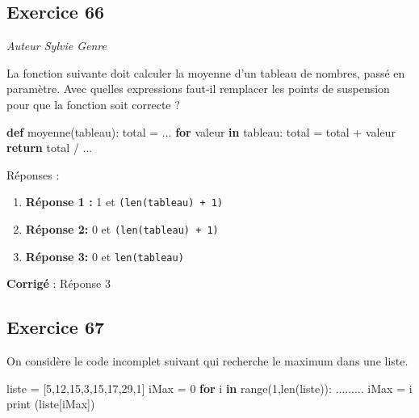\documentclass[11pt]{article}
\providecommand{\tightlist}{%
      \setlength{\itemsep}{0pt}\setlength{\parskip}{0pt}}
\newenvironment{Shaded}{}{}
\newcommand{\KeywordTok}[1]{\textcolor[rgb]{0.00,0.44,0.13}{\textbf{{#1}}}}
\newcommand{\DecValTok}[1]{\textcolor[rgb]{0.25,0.63,0.44}{{#1}}}
\newcommand{\NormalTok}[1]{{#1}}
\newcommand{\ControlFlowTok}[1]{\textcolor[rgb]{0.00,0.44,0.13}{\textbf{{#1}}}}
\newcommand{\OperatorTok}[1]{\textcolor[rgb]{0.40,0.40,0.40}{{#1}}}
\newcommand{\BuiltInTok}[1]{{#1}}
\begin{document}
    \hypertarget{exercice-66}{%
\subsection{Exercice 66}\label{exercice-66}}

\emph{Auteur Sylvie Genre}

La fonction suivante doit calculer la moyenne d'un tableau de nombres,
passé en paramètre. Avec quelles expressions faut-il remplacer les
points de suspension pour que la fonction soit correcte ?

\begin{Shaded}
\begin{Highlighting}[]
\KeywordTok{def}\NormalTok{ moyenne(tableau):}
\NormalTok{    total }\OperatorTok{=}\NormalTok{ ...}
    \ControlFlowTok{for}\NormalTok{ valeur }\KeywordTok{in}\NormalTok{ tableau:}
\NormalTok{        total }\OperatorTok{=}\NormalTok{ total }\OperatorTok{+}\NormalTok{ valeur}
    \ControlFlowTok{return}\NormalTok{ total }\OperatorTok{/}\NormalTok{ ...}
\end{Highlighting}
\end{Shaded}

Réponses :

\begin{enumerate}
\def\labelenumi{\arabic{enumi}.}
\tightlist
\item
  \textbf{Réponse 1 :} 1 et \texttt{(len(tableau)\ +\ 1)}
\item
  \textbf{Réponse 2:} 0 et \texttt{(len(tableau)\ +\ 1)}
\item
  \textbf{Réponse 3:} 0 et \texttt{len(tableau)}
\end{enumerate}

    \textbf{Corrigé} : Réponse 3

    \hypertarget{exercice-67}{%
\subsection{Exercice 67}\label{exercice-67}}

On considère le code incomplet suivant qui recherche le maximum dans une
liste.

\begin{Shaded}
\begin{Highlighting}[]
\NormalTok{liste }\OperatorTok{=}\NormalTok{ [}\DecValTok{5}\NormalTok{,}\DecValTok{12}\NormalTok{,}\DecValTok{15}\NormalTok{,}\DecValTok{3}\NormalTok{,}\DecValTok{15}\NormalTok{,}\DecValTok{17}\NormalTok{,}\DecValTok{29}\NormalTok{,}\DecValTok{1}\NormalTok{]}
\NormalTok{iMax }\OperatorTok{=} \DecValTok{0}
\ControlFlowTok{for}\NormalTok{ i }\KeywordTok{in} \BuiltInTok{range}\NormalTok{(}\DecValTok{1}\NormalTok{,}\BuiltInTok{len}\NormalTok{(liste)):}
\NormalTok{    .........}
\NormalTok{iMax }\OperatorTok{=}\NormalTok{ i}
\BuiltInTok{print}\NormalTok{ (liste[iMax])}
\end{Highlighting}
\end{Shaded}
\end{document}
